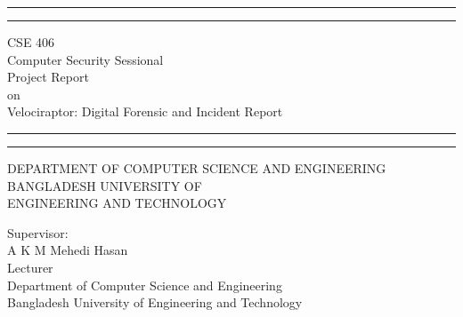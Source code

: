\documentclass[a4paper, 11pt, oneside]{article} %
\begin{document}
\begin{titlepage} %

	\centering %
	
	\scshape %
	
	\vspace*{\baselineskip} %
	
	
	\rule{\textwidth}{1.6pt}\vspace*{-\baselineskip}\vspace*{2pt} %
	\rule{\textwidth}{0.4pt} %
	
	\vspace{0.75\baselineskip} %
	
	{\LARGE CSE 406\\ Computer Security Sessional\\ Project Report\\ on \\ Velociraptor: Digital Forensic and Incident Report} %
	
	\vspace{0.75\baselineskip} %
	
	\rule{\textwidth}{0.4pt}\vspace*{-\baselineskip}\vspace{3.2pt} %
	\rule{\textwidth}{1.6pt} %
	
	\vspace{\baselineskip} %
	
	

        {DEPARTMENT OF COMPUTER SCIENCE AND ENGINEERING \\ \vspace{0.75\baselineskip} BANGLADESH UNIVERSITY OF \\ \vspace{0.5\baselineskip} ENGINEERING AND TECHNOLOGY}%
	
	\vspace*{2\baselineskip} %
        Supervisor:\\A K M Mehedi Hasan\\Lecturer\\Department of Computer Science and Engineering\\Bangladesh University of Engineering and Technology


\end{titlepage}
\end{document}
